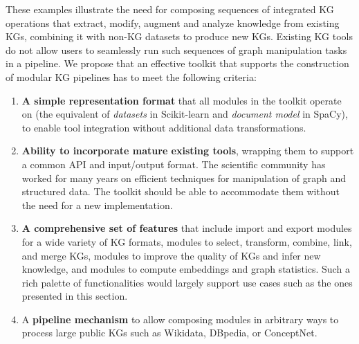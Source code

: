 \documentclass[runningheads]{llncs}
\newcommand{\kibitz}[2]{%
{\color{#1}#2}{}%
}
\newcommand{\DS}[1]{\kibitz{blue}{[DS: #1]}} %
\newcommand{\DG}[1]{\kibitz{red}{[DG: #1]}} %
\begin{document}
These examples illustrate the need for composing sequences of integrated KG operations that extract, modify, augment and analyze knowledge from existing KGs, combining it with non-KG datasets to produce new KGs. Existing KG tools do not allow users to seamlessly run such sequences of graph manipulation tasks in a pipeline. We propose that an effective toolkit that supports the construction of modular KG pipelines has to meet the following criteria:%

\begin{enumerate}
\item \textbf{A simple representation format} that all modules in the toolkit operate on (the equivalent of \textit{datasets} in Scikit-learn and \textit{document model} in SpaCy), to enable tool integration without additional data transformations.  

\item \textbf{Ability to incorporate mature existing tools}, wrapping them to support a common API and input/output format. The scientific community has worked for many years on efficient techniques for manipulation of graph and structured data. The toolkit should be able to accommodate them without the need for a new implementation. %
 
\item \textbf{A comprehensive set of features} that include import and export modules for a wide variety of KG formats, modules to select, transform, combine, link, and merge KGs, modules to improve the quality of KGs and infer new knowledge, and modules to compute embeddings and graph statistics. Such a rich palette of functionalities would largely support use cases such as the ones presented in this section.%

\item A \textbf{pipeline mechanism} to allow composing modules in arbitrary ways to process large public KGs such as Wikidata, DBpedia, or ConceptNet.%
\end{enumerate}
\end{document}
